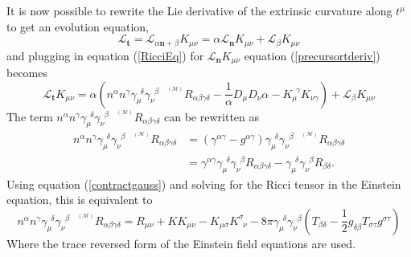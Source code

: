 \documentclass[11pt]{article}
\newcommand{\blank}{\enspace}
\newcommand{\sttensor}{\text{ }{\scriptscriptstyle ^{^{(\mathcal{M})}}}}
\numberwithin{equation}{section}
\begin{document}
It is now possible to rewrite the Lie derivative of the extrinsic curvature along $t^{\mu}$ to get an evolution equation,
\begin{equation} \label{precursortderiv}
    \mathcal{L_{\textbf{t}}} = \mathcal{L_{\alpha \textbf{n} + \beta}}K_{\mu\nu} = \alpha\mathcal{L_{\textbf{n}}}K_{\mu\nu} + \mathcal{L_{\beta}}K_{\mu\nu}
\end{equation}
and plugging in equation (\ref{RicciEq}) for $\mathcal{L_{\textbf{n}}}K_{\mu\nu}$ equation (\ref{precursortderiv}) becomes
\begin{equation} \label{unexpandedtderiv}
     \mathcal{L_{\textbf{t}}}K_{\mu\nu} = \alpha(n^{\alpha} n^{\gamma} \gamma_{\mu}^{\blank\delta} \gamma_{\nu}^{\blank\beta} \sttensor R_{\alpha\beta\gamma\delta} - \frac{1}{\alpha} D_{\mu} D_{\nu} \alpha - K^{\blank\gamma}_{\mu} K_{\nu\gamma}) + \mathcal{L_{\beta}}K_{\mu\nu} 
\end{equation}
The term $n^{\alpha} n^{\gamma} \gamma_{\mu}^{\blank\delta} \gamma_{\nu}^{\blank\beta} \sttensor R_{\alpha\beta\gamma\delta}$ can be rewritten as
\begin{equation}
\begin{split}
    n^{\alpha} n^{\gamma} \gamma_{\mu}^{\blank\delta} \gamma_{\nu}^{\blank\beta} \sttensor R_{\alpha\beta\gamma\delta} &= (\gamma^{\alpha\gamma} - g^{\alpha\gamma})\gamma_{\mu}^{\blank\delta}\gamma_{\nu}^{\blank\beta} \sttensor R_{\alpha\beta\gamma\delta} \\ 
    &= \gamma^{\alpha\gamma}\gamma_{\mu}^{\blank\delta}\gamma_{\nu}^{\blank\beta}R_{\alpha\beta\gamma\delta} - \gamma_{\mu}^{\blank\delta}\gamma_{\nu}^{\blank\beta}R_{\beta\delta}.
\end{split}
\end{equation}
Using equation (\ref{contractgauss}) and solving for the Ricci tensor in the Einstein equation, this is equivalent to
\begin{equation}
    n^{\alpha} n^{\gamma} \gamma_{\mu}^{\blank\delta} \gamma_{\nu}^{\blank\beta} \sttensor R_{\alpha\beta\gamma\delta} = R_{\mu\nu} + KK_{\mu\nu} - K_{\mu\sigma}K^{\sigma}_{\blank\nu} - 8\pi\gamma_{\mu}^{\blank\delta}\gamma_{\nu}^{\blank\beta}\left(T_{\beta\delta} - \frac12g_{\delta\beta}T_{\sigma\tau}g^{\sigma\tau}\right)
\end{equation}
Where the trace reversed form of the Einstein field equations are used. 
\end{document}
